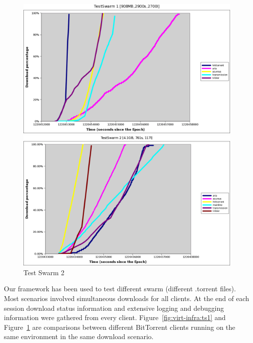 \begin{figure}
  \centering
  \begin{minipage}{0.8\textwidth}
  \includegraphics[width=\textwidth]{src/img/virt-infra/test-swarm1-labels}
  \caption{Test Swarm 1}
  \label{fig:virt-infra:ts1}
  \hspace{0.2cm}
  \includegraphics[width=\textwidth]{src/img/virt-infra/test-swarm2-labels}
  \caption{Test Swarm 2}
  \label{fig:virt-infra:ts2}
  \end{minipage}
\end{figure}

Our framework has been used to test different swarm (different .torrent
files). Most scenarios involved simultaneous downloads for all clients. At the
end of each session download status information and extensive logging and
debugging information were gathered from every client.
Figure~\ref{fig:virt-infra:ts1} and Figure~\ref{fig:virt-infra:ts2} are
comparisons between different BitTorrent clients running on the same
environment in the same download scenario.

